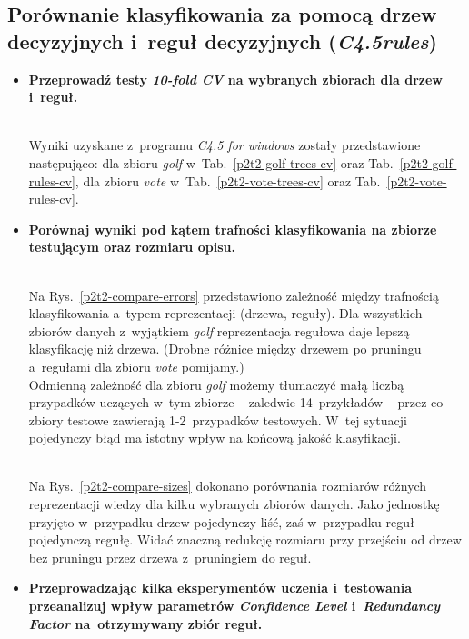\subsection{Porównanie klasyfikowania za pomocą drzew decyzyjnych i~reguł decyzyjnych (\emph{C4.5rules})}
\begin{itemize}
\item \textbf{Przeprowadź testy \emph{10-fold CV} na wybranych zbiorach dla drzew i~reguł.}





	\\Wyniki uzyskane z~programu \emph{C4.5 for windows} zostały przedstawione następująco: dla zbioru \emph{golf} w~Tab.~\ref{p2t2-golf-trees-cv} oraz Tab.~\ref{p2t2-golf-rules-cv}, dla zbioru \emph{vote} w~Tab.~\ref{p2t2-vote-trees-cv} oraz Tab.~\ref{p2t2-vote-rules-cv}.

\item \textbf{Porównaj wyniki pod kątem trafności klasyfikowania na zbiorze testującym oraz rozmiaru opisu.}
	
	
	\\Na Rys.~\ref{p2t2-compare-errors} przedstawiono zależność między trafnością klasyfikowania a~typem reprezentacji (drzewa, reguły). Dla wszystkich zbiorów danych z~wyjątkiem \emph{golf} reprezentacja regułowa daje lepszą klasyfikację niż drzewa. (Drobne różnice między drzewem po pruningu a~regułami dla zbioru \emph{vote} pomijamy.)
	\\Odmienną zależność dla zbioru \emph{golf} możemy tłumaczyć małą liczbą przypadków uczących w~tym zbiorze -- zaledwie 14~przykładów -- przez co zbiory testowe zawierają 1-2~przypadków testowych. W~tej sytuacji pojedynczy błąd ma istotny wpływ na końcową jakość klasyfikacji.
	
	
	\\Na Rys.~\ref{p2t2-compare-sizes} dokonano porównania rozmiarów różnych reprezentacji wiedzy dla kilku wybranych zbiorów danych. Jako jednostkę przyjęto w~przypadku drzew pojedynczy liść, zaś w~przypadku reguł pojedynczą regułę. Widać znaczną redukcję rozmiaru przy przejściu od drzew bez pruningu przez drzewa z~pruningiem do reguł.
	
\item \textbf{Przeprowadzając kilka eksperymentów uczenia i~testowania przeanalizuj wpływ parametrów \emph{Confidence Level} i~\emph{Redundancy Factor} na~otrzymywany zbiór reguł.}


\end{itemize}
